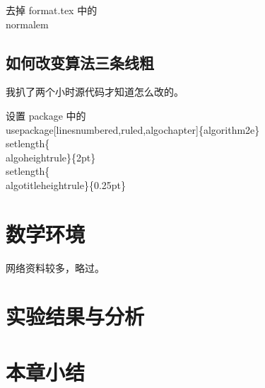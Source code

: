 去掉 format.tex 中的 \\normalem

\subsection{如何改变算法三条线粗}

我扒了两个小时源代码才知道怎么改的。

设置 package 中的
\\usepackage[linesnumbered,ruled,algochapter]\{algorithm2e\}
\\setlength\{\\algoheightrule\}\{2pt\}
\\setlength\{\\algotitleheightrule\}\{0.25pt\}

\section{数学环境}

网络资料较多，略过。

\section{实验结果与分析}

\section{本章小结}
